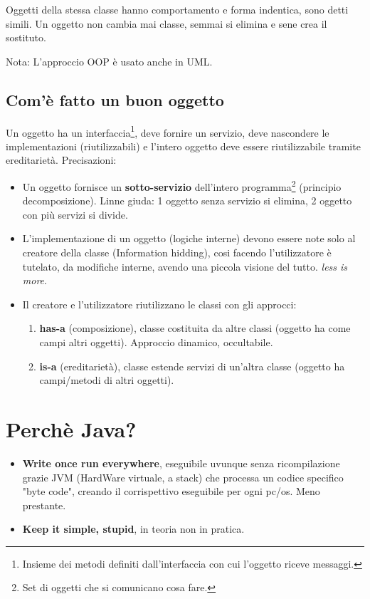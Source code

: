 Oggetti della stessa classe hanno comportamento e forma indentica, sono detti simili.
Un oggetto non cambia mai classe, semmai si elimina e sene crea il sostituto.

Nota: L'approccio OOP è usato anche in UML.

\subsection{Com'è fatto un buon oggetto}
Un oggetto ha un interfaccia\footnote{Insieme dei metodi definiti dall'interfaccia con cui l'oggetto riceve messaggi.}, deve fornire un servizio, deve nascondere le implementazioni (riutilizzabili) e l'intero oggetto deve essere riutilizzabile tramite ereditarietà. Precisazioni:
\begin{itemize}
	\item Un oggetto fornisce un \textbf{sotto-servizio} dell'intero programma\footnote{Set di oggetti che si comunicano cosa fare.} (principio decomposizione). Linne giuda: 1 oggetto senza servizio si elimina, 2 oggetto con più servizi si divide.

	\item L'implementazione di un oggetto (logiche interne) devono essere note solo al creatore della classe (Information hidding), cosi facendo l'utilizzatore è tutelato, da modifiche interne, avendo una piccola visione del tutto. \textit{less is more}.

	\item Il creatore e l'utilizzatore riutilizzano le classi con gli approcci:
	\begin{enumerate}
		\item \textbf{has-a} (composizione), classe costituita da altre classi (oggetto ha come campi altri oggetti). Approccio dinamico, occultabile.
		\item \textbf{is-a} (ereditarietà), classe estende servizi di un'altra classe (oggetto ha campi/metodi di altri oggetti).
	\end{enumerate}
\end{itemize}

\section{Perchè Java?}
\begin{itemize}
	\item \textbf{Write once run everywhere}, eseguibile uvunque senza ricompilazione grazie JVM (HardWare virtuale, a stack) che processa un codice specifico "byte code", creando il corrispettivo eseguibile per ogni pc/os. Meno prestante.

	\item \textbf{Keep it simple, stupid}, in teoria non in pratica.
\end{itemize}

